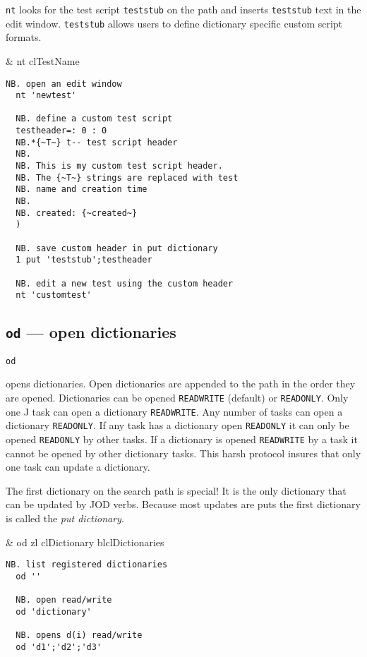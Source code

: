 \texttt{nt} looks for the test script \texttt{teststub} on the path and inserts 
\texttt{teststub} text in the edit window. \texttt{teststub} allows users to define dictionary specific
custom script formats.

\begin{wordhead}
\monad & nt clTestName \\
\end{wordhead}
\begin{lstlisting}[frame=single,framerule=0pt] 
  NB. open an edit window
  nt 'newtest'  

  NB. define a custom test script
  testheader=: 0 : 0
  NB.*{~T~} t-- test script header
  NB. 
  NB. This is my custom test script header.
  NB. The {~T~} strings are replaced with test
  NB. name and creation time
  NB.
  NB. created: {~created~}
  ) 

  NB. save custom header in put dictionary
  1 put 'teststub';testheader

  NB. edit a new test using the custom header
  nt 'customtest'
\end{lstlisting}


\subsection{\texttt{od} --- open dictionaries}\label{ss:od}

 \hypertarget{il:od}{\texttt{od}} opens
 dictionaries. Open dictionaries are appended to the
 path in the order they are opened. Dictionaries can be opened \texttt{READWRITE}
 (default) or \texttt{READONLY}. Only one J task can open 
 a dictionary \texttt{READWRITE}.  
 Any number of tasks can open a dictionary \texttt{READONLY}. 
 If any task has a dictionary open \texttt{READONLY} it can only 
 be opened \texttt{READONLY} by other tasks. If a 
 dictionary is opened \texttt{READWRITE} by a task it 
 cannot be opened by other dictionary tasks. This harsh protocol
  insures that only one task can update a dictionary. 

The first dictionary on the search path is special!  
It is the only dictionary that can be updated by JOD verbs. 
Because most updates are puts the first dictionary is called the \emph{put dictionary}.

\begin{wordhead}
\monad & od zl \argsep clDictionary \argsep blclDictionaries \\
\end{wordhead}
\begin{lstlisting}[frame=single,framerule=0pt] 
  NB. list registered dictionaries 
  od '' 

  NB. open read/write
  od 'dictionary'   
  
  NB. opens d(i) read/write 
  od 'd1';'d2';'d3'  
\end{lstlisting}

